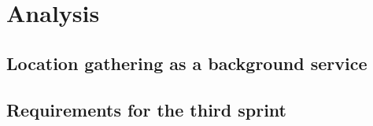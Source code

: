 \section{Analysis}

\subsection{Location gathering as a background service} \label{ssec:LocationGatherBGS}




\subsection{Requirements for the third sprint}
